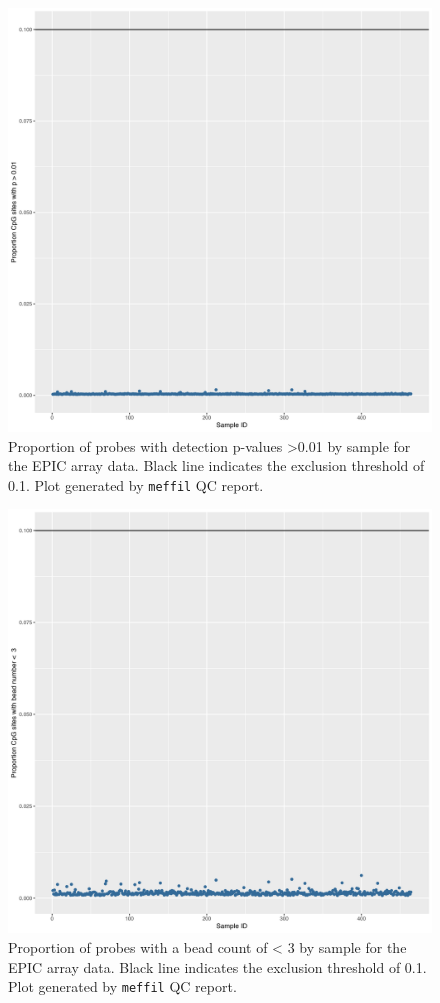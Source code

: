 \documentclass[
]{book}
\begin{document}
\begin{figure}

{\centering \includegraphics[width=0.8\linewidth]{figs/SWSqcEPICpropSites} 

}

\caption{Proportion of probes with detection p-values \textgreater0.01 by sample for the EPIC array data. Black line indicates the exclusion threshold of 0.1. Plot generated by \texttt{meffil} QC report.}\label{fig:SWSqcEPICpropSites}
\end{figure}



\begin{figure}

{\centering \includegraphics[width=0.8\linewidth]{figs/SWSqcEPICbeadNum} 

}

\caption{Proportion of probes with a bead count of \textless{} 3 by sample for the EPIC array data. Black line indicates the exclusion threshold of 0.1. Plot generated by \texttt{meffil} QC report.}\label{fig:SWSqcEPICbeadNum}
\end{figure}
\end{document}
